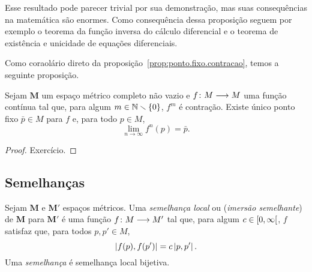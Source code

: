 Esse resultado pode parecer trivial por sua demonstração, mas suas consequências na matemática são enormes. Como consequência dessa proposição seguem por exemplo o teorema da função inversa do cálculo diferencial e o teorema de existência e unicidade de equações diferenciais.

Como coraolário direto da proposição~\ref{prop:ponto.fixo.contracao}, temos a seguinte proposição.

\begin{proposition}
\label{prop:ponto.fixo.iterada.contracao}
Sejam $\bm M$ um espaço métrico completo não vazio e ${f}\colon {M} \longrightarrow {M}$ uma função contínua tal que, para algum $m \in \mathbb{N} \smallsetminus \{0\}$, $f^m$ é contração. Existe único ponto fixo $\bar p \in M$ para $f$ e, para todo $p \in M$,
	\begin{equation*}
	\lim_{n \to \infty} f^n(p) = \bar p.
	\end{equation*}
\end{proposition}
\begin{proof}
Exercício.
\end{proof}

\begin{comment}
Como $f^n$ é contração, pela proposição~\ref{prop:ponto.fixo.contracao} ela tem único ponto fixo $\bar p$ e vale que, para todo $p \in M$
	\begin{equation*}
	\lim_{n \to \infty} f^{mn}(p) = \bar p.
	\end{equation*}
Em particular, para $f(p)$ vale
	\begin{equation*}
	\bar p = \lim_{n \to \infty} f^{mn}(f(p)) = \lim_{n \to \infty} f(f^{mn}(p)) = f(\bar p),
	\end{equation*}
o que mostra que $\bar p$ é ponto fixo de $f$. Agora, para todo $n \in \N$, sejam $q, r \in \N$ tais que $n = mq+r$, com $0 \leq < m$. Para todo $p \in M$, segue que
	\begin{equation*}
	f^n(p) = (f^m)^q(f^r(p))
	\end{equation*}
\end{comment}







\subsection{Semelhanças}

\begin{definition}
Sejam $\bm{M}$ e $\bm{M'}$ espaços métricos. Uma \emph{semelhança local} ou (\emph{imersão semelhante}) de $\bm{M}$ para $\bm{M'}$ é uma função ${f}\colon {M} \longrightarrow {M'}$ tal que, para algum $c \in \left[{0},{\infty}\right[$, $f$ satisfaz que, para todos $p,p' \in M$,
	\begin{equation*}
	\left\vert{f(p)},{f(p')}\right\vert = c \left\vert{p},{p'}\right\vert.
	\end{equation*}
Uma \emph{semelhança} é semelhança local bijetiva.
\end{definition}

